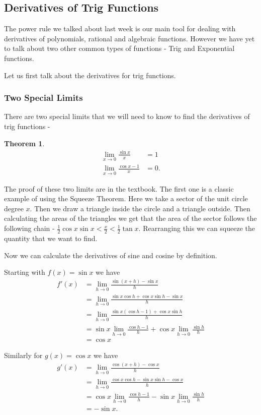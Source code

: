 \documentclass[12pt,reqno]{article}
\newtheorem{Theorem}{Theorem}
\theoremstyle{definition}
\begin{document}
\subsection{Derivatives of Trig Functions}
The power rule we talked about last week is our main tool for dealing with derivatives of polynomials, rational and algebraic functions. However we have yet to talk about two other common types of functions - Trig and Exponential functions. 

Let us first talk about the derivatives for trig functions. 
\subsubsection{Two Special Limits}
There are two special limits that we will need to know to find the derivatives of trig functions - 
\begin{Theorem}
	\begin{align*}
		\lim_{x \to 0} \frac{\sin x}{x} &= 1 \\
		\lim_{x \to 0} \frac{\cos x - 1}{x} &= 0.
	\end{align*}
\end{Theorem}

The proof of these two limits are in the textbook. The first one is a classic example of using the Squeeze Theorem. Here we take a sector of the unit circle degree $x$. Then we draw a triangle inside the circle and a triangle outside. Then calculating the areas of the triangles we get that the area of the sector follows the following chain - $\frac{1}{2} \cos x \sin x < \frac{x}{2} < \frac{1}{2} \tan x$. Rearranging this we can squeeze the quantity that we want to find. 

Now we can calculate the derivatives of sine and cosine by definition. 

Starting with $f(x) = \sin x$ we have
\begin{align*}
	f'(x) &= \lim_{h \to 0} \frac{\sin (x + h) - \sin x} {h} \\
		  &= \lim_{h \to 0} \frac{\sin x \cos h + \cos x \sin h - \sin x} {h} \\
		  &= \lim_{h \to 0} \frac{\sin x (\cos h - 1) + \cos x \sin h}{h} \\
		  &= \sin x \lim_{h \to 0} \frac{\cos h - 1}{h} + \cos x \lim_{h \to 0} \frac{\sin h}{h} \\
		  &= \cos x
\end{align*}

Similarly for $g(x) = \cos x$ we have 
\begin{align*}
	g'(x) &= \lim_{h \to 0} \frac{\cos (x + h) - \cos x} {h} \\
	      &= \lim_{h \to 0} \frac{\cos x \cos h - \sin x \sin h - \cos x}{h} \\
		  &= \cos x \lim_{h \to 0} \frac{\cos h - 1}{h} - \sin x \lim_{h \to 0} \frac{\sin h}{h} \\
		  &= -\sin x.
\end{align*}
\end{document}
